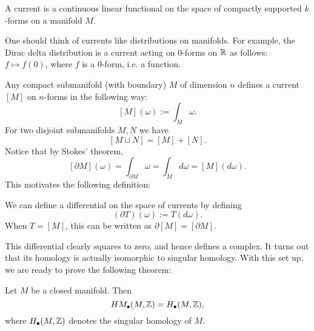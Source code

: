 \begin{definition}[Current]
    A current is a continuous linear functional on the space of compactly supported $k$-forms on a manifold $M$.
\end{definition}
\begin{remark}
    One should think of currents like distributions on manifolds. For example, the Dirac delta distribution is a current acting on $0$-forms on $\R$ as follows: $f \mapsto  f(0)$, where $f$ is a $0$-form, i.e. a function.
\end{remark}
\begin{eg}
    Any compact submanifold (with boundary) $M$ of dimension $n$ defines a current $[M]$ on $n$-forms in the following way:
    \[
        [M](\omega) := \int_M \omega
    .\] 
    For two disjoint submanifolds $M, N$ we have
    \[
        [M \sqcup N] = [M] + [N]
    .\] 
    Notice that by Stokes' theorem,
    \[
        [\partial M](\omega) = \int_{\partial M} \omega = \int_M d \omega = [M](d \omega).
    \] 
    This motivates the following definition:
\end{eg}
\begin{definition}
    We can define a differential on the space of currents by defining
    \[
        (\partial T) (\omega) := T(d \omega)
    .\] 
    When $T = [M]$, this can be written as $\partial [M] = [\partial M]$. 
\end{definition}
This differential clearly squares to zero, and hence defines a complex.
It turns out that its homology is actually isomorphic to singular homology.
With this set up, we are ready to prove the following theorem:

\begin{theorem}
    Let $M$ be a closed manifold. Then
     \[
         \HMf[\bul]{M, \Z} = H_{\bul}(M, \Z)
    ,\] 
    where $H_{\bul}(M, \Z)$ denotes the singular homology of $M$.
\end{theorem}

